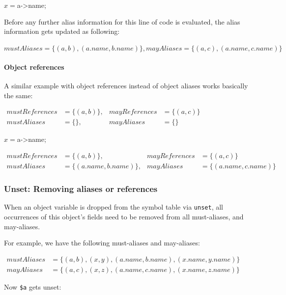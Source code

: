 \begin{phpcode}
$x = $a->name;
\end{phpcode}

Before any further alias information for this line of code is evaluated, the alias information gets updated as following:

$mustAliases = \{(a, b), (a.name, b.name)\}, mayAliases = \{(a, c), (a.name, c.name)\}$


\paragraph{Object references}

A similar example with object references instead of object aliases works basically the same:

$\begin{array}{llll}
mustReferences & = \{(a, b)\}, & mayReferences & = \{(a, c)\} \\
mustAliases & = \{\}, & mayAliases & = \{\}
\end{array}$

\begin{phpcode}
$x = $a->name;
\end{phpcode}

$\begin{array}{llll}
mustReferences & = \{(a, b)\}, & mayReferences & = \{(a, c)\} \\
mustAliases & = \{(a.name, b.name)\}, & mayAliases & = \{(a.name, c.name)\}
\end{array}$


\subsubsection{Unset: Removing aliases or references}

When an object variable is dropped from the symbol table via \texttt{unset}, all occurrences of this object's fields need to be removed from all must-aliases, and may-aliases.

For example, we have the following must-aliases and may-aliases:

$\begin{array}{ll}
mustAliases & = \{(a, b), (x, y), (a.name, b.name), (x.name, y.name)\} \\
mayAliases & = \{(a, c), (x, z), (a.name, c.name), (x.name, z.name)\}
\end{array}$

Now \texttt{\$a} gets unset:


